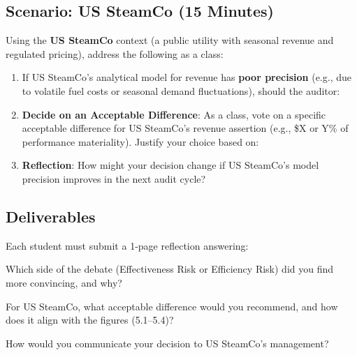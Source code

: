 \documentclass[11pt,a4paper,openany]{memoir}
\begin{document}
\subsection*{Scenario: US SteamCo (15 Minutes)}
Using the \textbf{US SteamCo} context (a public utility with seasonal revenue and regulated pricing), address the following as a class:

\begin{enumerate}
    \item If US SteamCo’s analytical model for revenue has \textbf{poor precision} (e.g., due to volatile fuel costs or seasonal demand fluctuations), should the auditor:

    \item \textbf{Decide on an Acceptable Difference}:
    As a class, vote on a specific acceptable difference for US SteamCo’s revenue assertion (e.g., \$X or Y\% of performance materiality). Justify your choice based on:

    \item \textbf{Reflection}: How might your decision change if US SteamCo’s model precision improves in the next audit cycle?
\end{enumerate}

\subsection*{Deliverables}
Each student must submit a 1-page reflection answering:
\begin{compactitem}
    \item Which side of the debate (Effectiveness Risk or Efficiency Risk) did you find more convincing, and why?
    \item For US SteamCo, what acceptable difference would you recommend, and how does it align with the figures (5.1–5.4)?
    \item How would you communicate your decision to US SteamCo’s management?
\end{compactitem}
\end{document}
